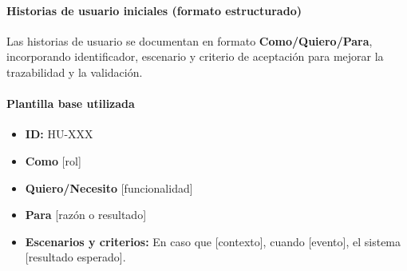 \paragraph{Historias de usuario iniciales (formato estructurado)}

Las historias de usuario se documentan en formato \textbf{Como/Quiero/Para}, incorporando identificador, escenario y criterio de aceptación para mejorar la trazabilidad y la validación.

\paragraph{Plantilla base utilizada}
\begin{itemize}
    \item \textbf{ID:} HU-XXX
    \item \textbf{Como} [rol]
    \item \textbf{Quiero/Necesito} [funcionalidad]
    \item \textbf{Para} [razón o resultado]
    \item \textbf{Escenarios y criterios:} En caso que [contexto], cuando [evento], el sistema [resultado esperado].
\end{itemize}

